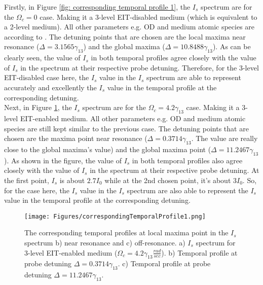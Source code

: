 Firstly, in Figure \ref{fig: corresponding temporal profile 1}, the $I_{s}$ spectrum are for the $\Omega_{c} = 0$ case. Making it a 3-level EIT-disabled medium (which is equivalent to a 2-level medium). All other parameters e.g. OD and medium atomic species are according to \cite{jeong2010slow}. The detuning points that are chosen are the local maxima near resonance ($\Delta = 3.1565\gamma_{13}$) and the global maxima ($\Delta = 10.8488\gamma_{13}$). As can be clearly seen, the value of $I_{s}$ in both temporal profiles agree closely with the value of $I_{s}$ in the spectrum at their respective probe detuning. Therefore, for the 3-level EIT-disabled case here, the $I_{s}$ value in the $I_{s}$ spectrum are able to represent accurately and excellently the $I_{s}$ value in the temporal profile at the corresponding detuning.\\

Next, in Figure \ref{fig: corresponding temporal profile 2}, the $I_{s}$ spectrum are for the $\Omega_{c} = 4.2\gamma_{13}$ case. Making it a 3-level EIT-enabled medium. All other parameters e.g. OD and medium atomic species are still kept similar to the previous case. The detuning points that are chosen are the maxima point near resonance ($\Delta = 0.3714\gamma_{13}$. The value are really close to the global maxima's value) and the global maxima point ($\Delta = 11.2467\gamma_{13}$). As shown in the figure, the value of $I_{s}$ in both temporal profiles also agree closely with the value of $I_{s}$ in the spectrum at their respective probe detuning. At the first point, $I_{s}$ is about $2.7I_{0}$ while at the 2nd chosen point, it's about $3I_{0}$. So, for the case here, the $I_{s}$ value in the $I_{s}$ spectrum are also able to represent the $I_{s}$ value in the temporal profile at the corresponding detuning.

\begin{figure}[h!]
    \centering
     \texttt{[image: Figures/correspondingTemporalProfile1.png]}
    \caption{The corresponding temporal profiles at local maxima point in the $I_{s}$ spectrum b) near resonance and c) off-resonance. a) $I_{s}$ spectrum for 3-level EIT-enabled medium ($\Omega_{c} = 4.2\gamma_{13} \frac{rad}{sec}$). b)  Temporal profile at probe detuning $\Delta = 0.3714\gamma_{13}$. c) Temporal profile at probe detuning $\Delta = 11.2467\gamma_{13}$.}
    \label{fig: corresponding temporal profile 2}
\end{figure}


